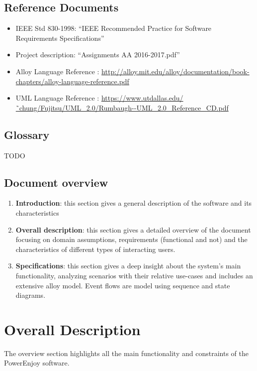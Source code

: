 \documentclass[12pt]{article}
\begin{document}
	
	\subsection{Reference Documents}
	 \begin{itemize}
	 	\item IEEE Std 830-1998: “IEEE Recommended Practice for Software Requirements Specifications”
	 	\item Project description: “Assignments AA 2016-2017.pdf”
	 	\item Alloy Language Reference : \url{http://alloy.mit.edu/alloy/documentation/book-chapters/alloy-language-reference.pdf}
	 	\item UML Language Reference : \url{https://www.utdallas.edu/˜chung/Fujitsu/UML_2.0/Rumbaugh--UML_2.0_Reference_CD.pdf}
	 \end{itemize}
	\subsection{Glossary}
	TODO
	
	\subsection{Document overview}
	\begin{enumerate}
		\item \textbf{Introduction}: this section gives a general 	description of the software and its characteristics 
		\item \textbf{Overall description}: this section gives a detailed overview of the document focusing on domain assumptions, requirements (functional and not) and the characteristics of different types of interacting users.
		\item \textbf{Specifications}: this section gives a deep insight about the system's main functionality, analyzing scenarios with their relative use-cases and includes an extensive alloy model. Event flows are model using sequence and state diagrams.
	\end{enumerate}	
	
	\newpage
	\section{\Large Overall Description}
	The overview section highlights all the main functionality and constraints of the PowerEnjoy software.  
\end{document}
